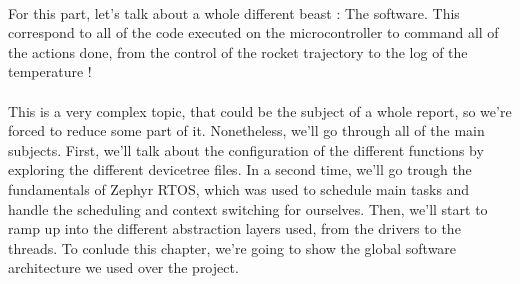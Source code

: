 \paragraph{}
For this part, let's talk about a whole different beast : The software. This
correspond to all of the code executed on the microcontroller to command all of
the actions done, from the control of the rocket trajectory to the log of the
temperature !

\paragraph{}
This is a very complex topic, that could be the subject of a whole report, so
we're forced to reduce some part of it. Nonetheless, we'll go through all of
the main subjects. First, we'll talk about the configuration of the different
functions by exploring the different devicetree files. In a second time, we'll
go trough the fundamentals of Zephyr RTOS, which was used to schedule main
tasks and handle the scheduling and context switching for ourselves. Then,
we'll start to ramp up into the different abstraction layers used, from the
drivers to the threads. To conlude this chapter, we're going to show the global
software architecture we used over the project.








